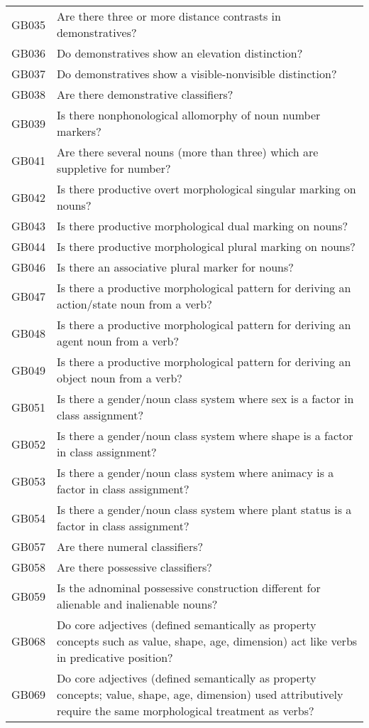 \begin{longtable}{p{3cm}p{12cm}}
  GB035 & Are there three or more distance contrasts in demonstratives? \\ 
  GB036 & Do demonstratives show an elevation distinction? \\ 
  GB037 & Do demonstratives show a visible-nonvisible distinction? \\ 
  GB038 & Are there demonstrative classifiers? \\ 
  GB039 & Is there nonphonological allomorphy of noun number markers? \\ 
  GB041 & Are there several nouns (more than three) which are suppletive for number? \\ 
  GB042 & Is there productive overt morphological singular marking on nouns? \\ 
  GB043 & Is there productive morphological dual marking on nouns? \\ 
  GB044 & Is there productive morphological plural marking on nouns? \\ 
  GB046 & Is there an associative plural marker for nouns? \\ 
  GB047 & Is there a productive morphological pattern for deriving an action/state noun from a verb? \\ 
  GB048 & Is there a productive morphological pattern for deriving an agent noun from a verb? \\ 
  GB049 & Is there a productive morphological pattern for deriving an object noun from a verb? \\ 
  GB051 & Is there a gender/noun class system where sex is a factor in class assignment? \\ 
  GB052 & Is there a gender/noun class system where shape is a factor in class assignment? \\ 
  GB053 & Is there a gender/noun class system where animacy is a factor in class assignment? \\ 
  GB054 & Is there a gender/noun class system where plant status is a factor in class assignment? \\ 
  GB057 & Are there numeral classifiers? \\ 
  GB058 & Are there possessive classifiers? \\ 
  GB059 & Is the adnominal possessive construction different for alienable and inalienable nouns? \\ 
  GB068 & Do core adjectives (defined semantically as property concepts such as value, shape, age, dimension) act like verbs in predicative position? \\ 
  GB069 & Do core adjectives (defined semantically as property concepts; value, shape, age, dimension) used attributively require the same morphological treatment as verbs? \\ 

\end{longtable}
